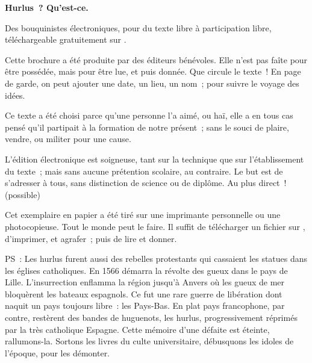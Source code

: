 \documentclass[french,twoside]{book} %
\newif\ifdev
\renewcommand{\LettrineFontHook}{\color{rubric}}
\newcommand{\initialiv}[2]{%
  \let\oldLFH\LettrineFontHook
  \IfSubStr{QJ’}{#1}{
    \lettrine[lines=4, lhang=0.2, loversize=-0.1, lraise=0.2]{\smash{#1}}{#2}
  }{\IfSubStr{É}{#1}{
    \lettrine[lines=4, lhang=0.2, loversize=-0, lraise=0]{\smash{#1}}{#2}
  }{\IfSubStr{ÀÂ}{#1}{
    \lettrine[lines=4, lhang=0.2, loversize=-0, lraise=0, slope=0.6em]{\smash{#1}}{#2}
  }{\IfSubStr{A}{#1}{
    \lettrine[lines=4, lhang=0.2, loversize=0.2, slope=0.6em]{\smash{#1}}{#2}
  }{\IfSubStr{V}{#1}{
    \lettrine[lines=4, lhang=0.2, loversize=0.2, slope=-0.5em]{\smash{#1}}{#2}
  }{
    \lettrine[lines=4, lhang=0.2, loversize=0.2]{\smash{#1}}{#2}
  }}}}}
  \let\LettrineFontHook\oldLFH
}
\renewcommand{\LettrineFontHook}{\bfseries\color{rubric}}
\begin{document}
  \hbox{}\newpage
  \ifodd\value{page}\hbox{}\newpage\fi
  {\centering\color{rubric}\bfseries\noindent\large
    Hurlus ? Qu’est-ce.\par
    \bigskip
  }
  \noindent Des bouquinistes électroniques, pour du texte libre à participation libre,
  téléchargeable gratuitement sur \href{https://hurlus.fr}{}.\par
  \bigskip
  \noindent Cette brochure a été produite par des éditeurs bénévoles.
  Elle n’est pas faîte pour être possédée, mais pour être lue, et puis donnée.
  Que circule le texte !
  En page de garde, on peut ajouter une date, un lieu, un nom ; pour suivre le voyage des idées.
  \par

  Ce texte a été choisi parce qu’une personne l’a aimé,
  ou haï, elle a en tous cas pensé qu’il partipait à la formation de notre présent ;
  sans le souci de plaire, vendre, ou militer pour une cause.
  \par

  L’édition électronique est soigneuse, tant sur la technique
  que sur l’établissement du texte ; mais sans aucune prétention scolaire, au contraire.
  Le but est de s’adresser à tous, sans distinction de science ou de diplôme.
  Au plus direct ! (possible)
  \par

  Cet exemplaire en papier a été tiré sur une imprimante personnelle
   ou une photocopieuse. Tout le monde peut le faire.
  Il suffit de
  télécharger un fichier sur \href{https://hurlus.fr}{},
  d’imprimer, et agrafer ; puis de lire et donner.\par

  \bigskip

  \noindent PS : Les hurlus furent aussi des rebelles protestants qui cassaient les statues dans les églises catholiques. En 1566 démarra la révolte des gueux dans le pays de Lille. L’insurrection enflamma la région jusqu’à Anvers où les gueux de mer bloquèrent les bateaux espagnols.
  Ce fut une rare guerre de libération dont naquit un pays toujours libre : les Pays-Bas.
  En plat pays francophone, par contre, restèrent des bandes de huguenots, les hurlus, progressivement réprimés par la très catholique Espagne.
  Cette mémoire d’une défaite est éteinte, rallumons-la. Sortons les livres du culte universitaire, débusquons les idoles de l’époque, pour les démonter.
\fi

\ifdev %
\fontname\font — \textsc{Les règles du jeu}\par
(\hyperref[utopie]{\underline{Lien}})\par
\noindent \initialiv{A}{lors là}\blindtext\par
\noindent \initialiv{À}{ la bonheur des dames}\blindtext\par
\noindent \initialiv{É}{tonnez-le}\blindtext\par
\noindent \initialiv{Q}{ualitativement}\blindtext\par
\noindent \initialiv{V}{aloriser}\blindtext\par
\Blindtext
\phantomsection
\label{utopie}
\Blinddocument
\fi
\end{document}
